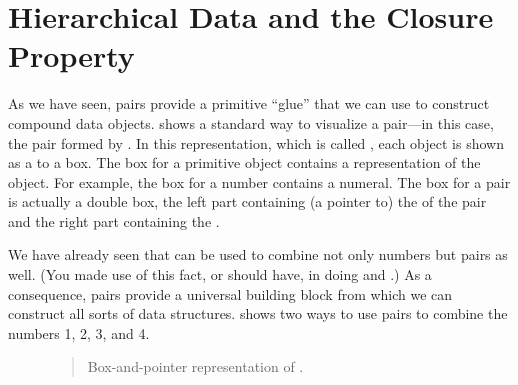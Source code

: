 \section{Hierarchical Data and the Closure Property}
\label{Section 2.2}

As we have seen, pairs provide a primitive ``glue'' that we can use to
construct compound data objects.   shows a standard way to
visualize a pair---in this case, the pair formed by .  In this
representation, which is called , each object
is shown as a  to a box.  The box for a primitive object
contains a representation of the object.  For example, the box for a number
contains a numeral.  The box for a pair is actually a double box, the left part
containing (a pointer to) the  of the pair and the right part
containing the .

We have already seen that  can be used to combine not only numbers
but pairs as well.  (You made use of this fact, or should have, in doing
 and .)  As a consequence, pairs provide a
universal building block from which we can construct all sorts of data
structures.   shows two ways to use pairs to combine the
numbers 1, 2, 3, and 4.

\begin{figure}[tb]
\label{Figure 2.2}
\centering

\begin{quote}
 Box-and-pointer representation of .
\end{quote}
\end{figure}

